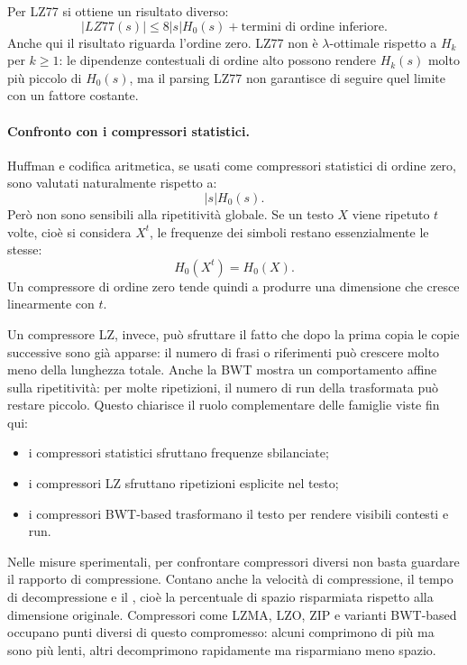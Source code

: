 \documentclass{article}
\theoremstyle{definition}
\numberwithin{equation}{section}
\begin{document}
Per LZ77 si ottiene un risultato diverso:
\begin{equation}\label{eq:lz77_zero_order_bound}
    |LZ77(s)|
    \leq
    8|s|H_0(s)
    +
    \text{termini di ordine inferiore}.
\end{equation}
Anche qui il risultato riguarda l'ordine zero. LZ77 non è $\lambda$-ottimale rispetto a $H_k$ per $k\geq 1$: le dipendenze contestuali di ordine alto possono rendere $H_k(s)$ molto più piccolo di $H_0(s)$, ma il parsing LZ77 non garantisce di seguire quel limite con un fattore costante.

\paragraph{Confronto con i compressori statistici.}
Huffman e codifica aritmetica, se usati come compressori statistici di ordine zero, sono valutati naturalmente rispetto a:
\[
    |s|H_0(s).
\]
Però non sono sensibili alla ripetitività globale. Se un testo $X$ viene ripetuto $t$ volte, cioè si considera $X^t$, le frequenze dei simboli restano essenzialmente le stesse:
\[
    H_0(X^t)=H_0(X).
\]
Un compressore di ordine zero tende quindi a produrre una dimensione che cresce linearmente con $t$.

Un compressore LZ, invece, può sfruttare il fatto che dopo la prima copia le copie successive sono già apparse: il numero di frasi o riferimenti può crescere molto meno della lunghezza totale. Anche la BWT mostra un comportamento affine sulla ripetitività: per molte ripetizioni, il numero di run della trasformata può restare piccolo. Questo chiarisce il ruolo complementare delle famiglie viste fin qui:
\begin{itemize}
    \item i compressori statistici sfruttano frequenze sbilanciate;
    \item i compressori LZ sfruttano ripetizioni esplicite nel testo;
    \item i compressori BWT-based trasformano il testo per rendere visibili contesti e run.
\end{itemize}

Nelle misure sperimentali, per confrontare compressori diversi non basta guardare il rapporto di compressione. Contano anche la velocità di compressione, il tempo di decompressione e il \textbf{}, cioè la percentuale di spazio risparmiata rispetto alla dimensione originale. Compressori come LZMA, LZO, ZIP e varianti BWT-based occupano punti diversi di questo compromesso: alcuni comprimono di più ma sono più lenti, altri decomprimono rapidamente ma risparmiano meno spazio.
\end{document}
